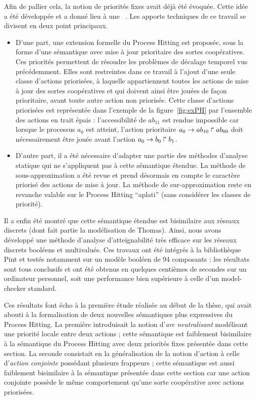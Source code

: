 Afin de pallier cela, la notion de priorités fixes avait déjà été évoquée.
Cette idée a été développée et a donné lieu à une ~\cite{FPMR13-CS3Bio}.
Les apports techniques de ce travail se divisent en deux point principaux.
\begin{itemize}
  \item D'une part, une extension formelle du Process Hitting est proposée, sous la forme d'une sémantique avec mise à jour prioritaire des sortes coopératives.
  Ces priorités permettent de résoudre les problèmes de décalage temporel vus précédemment.
  Elles sont restreintes dans ce travail à l'ajout d'une seule classe d'actions priorisées, à laquelle appartiennent toutes les actions de mise à jour des sortes coopératives et qui doivent ainsi être jouées de façon prioritaire, avant toute autre action non priorisée.
  Cette classe d'actions priorisées est représentée dans l'exemple de la figure~\ref{fig:exPH} par l'ensemble des actions en trait épais :
  l'accessibilité de $ab_{11}$ est rendue impossible car lorsque le processus $a_0$ est atteint, l'action prioritaire $a_0\rightarrow ab_{10}\Rsh ab_{00}$ doit nécessairement être jouée avant l'action $a_0\rightarrow b_0\Rsh b_1$.
  \item D'autre part, il a été nécessaire d'adapter une partie des méthodes d'analyse statique qui ne s'appliquent pas à cette sémantique étendue.
  La méthode de sous-approximation a été revue et prend désormais en compte le caractère priorisé des actions de mise à jour.
  La méthode de sur-approximation reste en revanche valable sur le Process Hitting “aplati” (\ie sans considérer les classes de priorité).
\end{itemize}
Il a enfin été montré que cette sémantique étendue est bisimilaire aux réseaux discrets (dont fait partie la modélisation de Thomas).
Ainsi, nous avons développé une méthode d'analyse d'atteignabilité très efficace sur les réseaux discrets booléens et multivalués.
Ces travaux ont été intégrés à la bibliothèque Pint et testés notamment sur un modèle booléen de 94 composants :
les résultats sont tous conclusifs et ont été obtenus en quelques centièmes de secondes sur un ordinateur personnel,
soit une performance bien supérieure à celle d'un model-checker standard.

Ces résultats font écho à la première étude réalisée au début de la thèse, qui avait abouti à la formalisation de deux nouvelles sémantiques plus expressives du Process Hitting.
La première introduisait la notion d'\emph{arc neutralisant} modélisant une priorité locale entre deux actions ;
cette sémantique est faiblement bisimilaire à la sémantique du Process Hitting avec deux priorités fixes présentée dans cette section.
La seconde consistait en la généralisation de la notion d'action à celle d'\emph{action conjointe} possédant plusieurs frappeurs ;
cette sémantique est aussi faiblement bisimilaire à la sémantique présentée dans cette section car une action conjointe possède le même comportement qu'une sorte coopérative avec actions priorisées.



